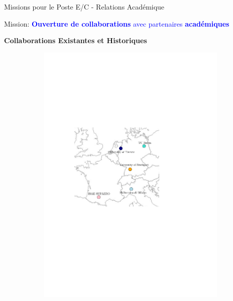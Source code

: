 \documentclass[aspectratio=169, french]{beamer}
\begin{document}
\begin{frame}{Missions pour le Poste E/C - Relations Académique}
	\begin{tcolorbox}
	Mission: \textcolor{blue}{\textbf{Ouverture de collaborations} avec partenaires \textbf{académiques}}
	\end{tcolorbox}
	
	
	\textbf{Collaborations Existantes et Historiques} 
	\begin{figure}[t]
		\begin{subfigure}{0.5\textwidth}
			\includegraphics[height=.6\textheight]{mappe_reseau_europe.pdf}%
		\end{subfigure}\hfill
		\begin{subfigure}{0.4\textwidth}

\end{subfigure}
\end{figure}
\end{frame}
\end{document}
